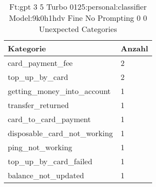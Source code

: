 
    \begin{table}[!ht]
        \centering
        \begin{tabularx}{\textwidth}{X X}
\toprule
\textbf{Kategorie} & \textbf{Anzahl} \\
\midrule
card\_payment\_fee & \num{2} \\
top\_up\_by\_card & \num{2} \\
getting\_money\_into\_account & \num{1} \\
transfer\_returned & \num{1} \\
card\_to\_card\_payment & \num{1} \\
disposable\_card\_not\_working & \num{1} \\
ping\_not\_working & \num{1} \\
top\_up\_by\_card\_failed & \num{1} \\
balance\_not\_updated & \num{1} \\
\bottomrule
\end{tabularx}

        \caption{Ft:gpt 3 5 Turbo 0125:personal:classifier Model:9k0h1hdv Fine No Prompting 0 0 Unexpected Categories}
        \label{tab:ft:gpt-3-5-turbo-0125:personal:classifier-model:9k0H1hdV-fine-no-prompting-0-0-unexpected-categories}
    \end{table}
    